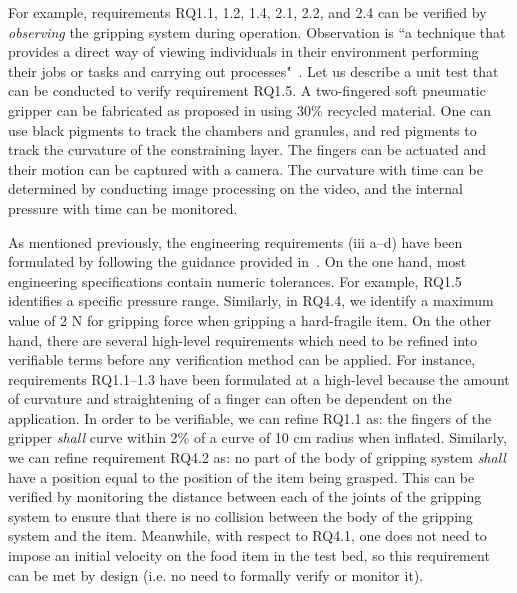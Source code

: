 \documentclass[letterpaper, 10 pt, conference]{ieeeconf}  %
\begin{document}
	For example, requirements RQ1.1, 1.2, 1.4, 2.1, 2.2, and 2.4 can be verified by \emph{observing} the gripping system during operation. 
	Observation is ``a technique that provides a direct way of viewing individuals in their environment performing their jobs or tasks and carrying out processes"~\cite{ISO24765:2017}.
	Let us describe a unit test that can be conducted to verify requirement RQ1.5. 
	A two-fingered soft pneumatic gripper can be fabricated as proposed in \cite{Partridge2022} using 30\% recycled material. 
	One can use black pigments to track the chambers and granules, and red pigments to track the curvature of the constraining layer. 
	The fingers can be actuated and their motion can be captured with a camera. 
	The curvature with time can be determined by conducting image processing on the video, and the internal pressure with time can be monitored.
	
	As mentioned previously, the engineering requirements (iii a--d) have been formulated by following the guidance provided in~\cite{NASA2007}. 
	On the one hand, most engineering specifications contain numeric tolerances. 
	For example, RQ1.5 identifies a specific pressure range. 
	Similarly, in RQ4.4, we identify a maximum value of 2 N for gripping force when gripping a hard-fragile item. 
	On the other hand, there are several high-level requirements which need to be refined into verifiable terms before any verification method can be applied.  
	For instance, requirements RQ1.1--1.3 have been formulated at a high-level because the amount of curvature and straightening of a finger can often be dependent on the application. 
	In order to be verifiable, we can refine RQ1.1 as: the fingers of the gripper \emph{shall} curve within 2\% of a curve of 10 cm radius when inflated. 
	Similarly, we can refine requirement RQ4.2 as: no part of the body of gripping system \emph{shall} have a position equal to the position of the item being grasped. 
	This can be verified by monitoring the distance between each of the joints of the gripping system to ensure that there is no collision between the body of the gripping system and the item. 
	Meanwhile, with respect to RQ4.1, one does not need to impose an initial velocity on the food item in the test bed, so this requirement can be met by design (i.e. no need to formally verify or monitor it).
	
\end{document}
